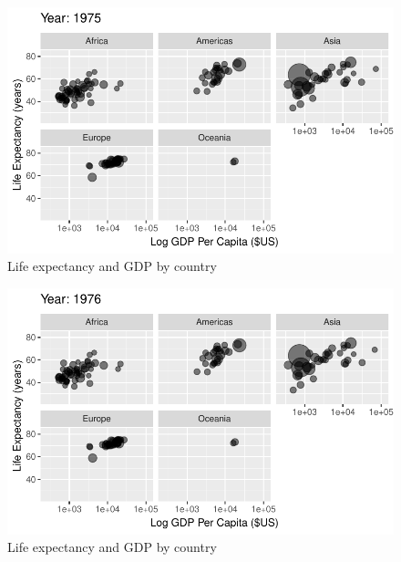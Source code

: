 \documentclass[
  letterpaper,
  DIV=11,
  numbers=noendperiod]{scrreport}
\theoremstyle{definition}
\theoremstyle{remark}
\begin{document}
\begin{figure}

{\centering \includegraphics{index_files/figure-pdf/fig-anim-lifegdp-43.pdf}

}

\caption{\label{fig-anim-lifegdp-43}Life expectancy and GDP by country}

\end{figure}

\begin{figure}

{\centering \includegraphics{index_files/figure-pdf/fig-anim-lifegdp-44.pdf}

}

\caption{\label{fig-anim-lifegdp-44}Life expectancy and GDP by country}

\end{figure}
\end{document}

